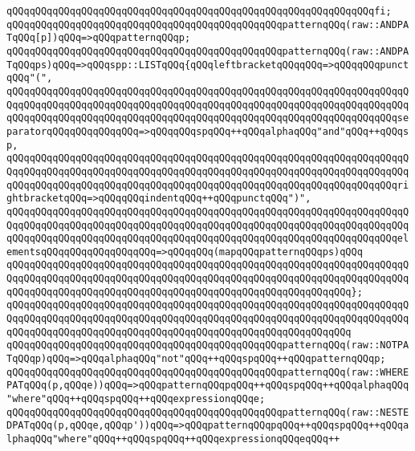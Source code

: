 \verb|qQQqqQQqqQQqqQQqqQQqqQQqqQQqqQQqqQQqqQQqqQQqqQQqqQQqqQQqqQQqqQQqfi;|\newline
\newline
\verb|qQQqqQQqqQQqqQQqqQQqqQQqqQQqqQQqqQQqqQQqqQQqqQQqpatternqQQq(raw::ANDPATqQQq[p])qQQq=>qQQqpatternqQQqp;|\newline
\newline
\verb|qQQqqQQqqQQqqQQqqQQqqQQqqQQqqQQqqQQqqQQqqQQqqQQqpatternqQQq(raw::ANDPATqQQqps)qQQq=>qQQqspp::LISTqQQq{qQQqleftbracketqQQqqQQq=>qQQqqQQqpunctqQQq"(",|\newline
\verb|qQQqqQQqqQQqqQQqqQQqqQQqqQQqqQQqqQQqqQQqqQQqqQQqqQQqqQQqqQQqqQQqqQQqqQQqqQQqqQQqqQQqqQQqqQQqqQQqqQQqqQQqqQQqqQQqqQQqqQQqqQQqqQQqqQQqqQQqqQQqqQQqqQQqqQQqqQQqqQQqqQQqqQQqqQQqqQQqqQQqqQQqqQQqqQQqqQQqqQQqqQQqqQQqseparatorqQQqqQQqqQQqqQQq=>qQQqqQQqspqQQq++qQQqalphaqQQq"and"qQQq++qQQqsp,|\newline
\verb|qQQqqQQqqQQqqQQqqQQqqQQqqQQqqQQqqQQqqQQqqQQqqQQqqQQqqQQqqQQqqQQqqQQqqQQqqQQqqQQqqQQqqQQqqQQqqQQqqQQqqQQqqQQqqQQqqQQqqQQqqQQqqQQqqQQqqQQqqQQqqQQqqQQqqQQqqQQqqQQqqQQqqQQqqQQqqQQqqQQqqQQqqQQqqQQqqQQqqQQqqQQqqQQqrightbracketqQQq=>qQQqqQQqindentqQQq++qQQqpunctqQQq")",|\newline
\verb|qQQqqQQqqQQqqQQqqQQqqQQqqQQqqQQqqQQqqQQqqQQqqQQqqQQqqQQqqQQqqQQqqQQqqQQqqQQqqQQqqQQqqQQqqQQqqQQqqQQqqQQqqQQqqQQqqQQqqQQqqQQqqQQqqQQqqQQqqQQqqQQqqQQqqQQqqQQqqQQqqQQqqQQqqQQqqQQqqQQqqQQqqQQqqQQqqQQqqQQqqQQqqQQqelementsqQQqqQQqqQQqqQQqqQQq=>qQQqqQQq(mapqQQqpatternqQQqps)qQQq|\newline
\verb|qQQqqQQqqQQqqQQqqQQqqQQqqQQqqQQqqQQqqQQqqQQqqQQqqQQqqQQqqQQqqQQqqQQqqQQqqQQqqQQqqQQqqQQqqQQqqQQqqQQqqQQqqQQqqQQqqQQqqQQqqQQqqQQqqQQqqQQqqQQqqQQqqQQqqQQqqQQqqQQqqQQqqQQqqQQqqQQqqQQqqQQqqQQqqQQqqQQqqQQq};|\newline
\verb|qQQqqQQqqQQqqQQqqQQqqQQqqQQqqQQqqQQqqQQqqQQqqQQqqQQqqQQqqQQqqQQqqQQqqQQqqQQqqQQqqQQqqQQqqQQqqQQqqQQqqQQqqQQqqQQqqQQqqQQqqQQqqQQqqQQqqQQqqQQqqQQqqQQqqQQqqQQqqQQqqQQqqQQqqQQqqQQqqQQqqQQqqQQqqQQqqQQqqQQq|\newline
\newline
\verb|qQQqqQQqqQQqqQQqqQQqqQQqqQQqqQQqqQQqqQQqqQQqqQQqpatternqQQq(raw::NOTPATqQQqp)qQQq=>qQQqalphaqQQq"not"qQQq++qQQqspqQQq++qQQqpatternqQQqp;|\newline
\verb|qQQqqQQqqQQqqQQqqQQqqQQqqQQqqQQqqQQqqQQqqQQqqQQqpatternqQQq(raw::WHEREPATqQQq(p,qQQqe))qQQq=>qQQqpatternqQQqpqQQq++qQQqspqQQq++qQQqalphaqQQq"where"qQQq++qQQqspqQQq++qQQqexpressionqQQqe;|\newline
\verb|qQQqqQQqqQQqqQQqqQQqqQQqqQQqqQQqqQQqqQQqqQQqqQQqpatternqQQq(raw::NESTEDPATqQQq(p,qQQqe,qQQqp'))qQQq=>qQQqpatternqQQqpqQQq++qQQqspqQQq++qQQqalphaqQQq"where"qQQq++qQQqspqQQq++qQQqexpressionqQQqeqQQq++|\newline
